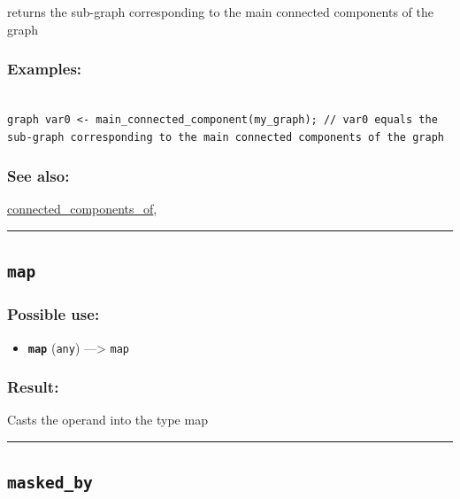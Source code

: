 \documentclass[]{book}
\providecommand{\tightlist}{%
  \setlength{\itemsep}{0pt}\setlength{\parskip}{0pt}}
\theoremstyle{definition}
\theoremstyle{definition}
\theoremstyle{definition}
\theoremstyle{remark}
\begin{document}
returns the sub-graph corresponding to the main connected components of
the graph

\subsubsection{Examples:}\label{examples-230}

\begin{verbatim}
 
graph var0 <- main_connected_component(my_graph); // var0 equals the sub-graph corresponding to the main connected components of the graph
\end{verbatim}

\subsubsection{See also:}\label{see-also-131}

\href{operators-b-to-c.html\#connected_components_of}{connected\_components\_of},

\begin{center}\rule{0.5\linewidth}{\linethickness}\end{center}

\subsection{\texorpdfstring{\texttt{map}}{map}}\label{map}

\subsubsection{Possible use:}\label{possible-use-333}

\begin{itemize}
\tightlist
\item
  \textbf{\texttt{map}} (\texttt{any}) ---\textgreater{} \texttt{map}
\end{itemize}

\subsubsection{Result:}\label{result-323}

Casts the operand into the type map

\begin{center}\rule{0.5\linewidth}{\linethickness}\end{center}

\subsection{\texorpdfstring{\texttt{masked\_by}}{masked\_by}}\label{masked_by}
\end{document}
